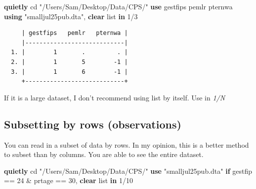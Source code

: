\documentclass[
]{book}
\newenvironment{Shaded}{\begin{snugshade}}{\end{snugshade}}
\newcommand{\KeywordTok}[1]{\textcolor[rgb]{0.13,0.29,0.53}{\textbf{#1}}}
\newcommand{\NormalTok}[1]{#1}
\newcommand{\OtherTok}[1]{\textcolor[rgb]{0.56,0.35,0.01}{#1}}
\newcommand{\StringTok}[1]{\textcolor[rgb]{0.31,0.60,0.02}{#1}}
\begin{document}
\begin{Shaded}
\begin{Highlighting}[]
\KeywordTok{quietly}\NormalTok{ cd }\StringTok{"/Users/Sam/Desktop/Data/CPS/"}
\KeywordTok{use}\NormalTok{ gestfips pemlr pternwa }\KeywordTok{using} \StringTok{"smalljul25pub.dta"}\NormalTok{, }\KeywordTok{clear}
\OtherTok{list} \KeywordTok{in}\NormalTok{ 1/3}
\end{Highlighting}
\end{Shaded}

\begin{verbatim}
     | gestfips   pemlr   pternwa |
     |----------------------------|
  1. |        1       .         . |
  2. |        1       5        -1 |
  3. |        1       6        -1 |
     +----------------------------+
\end{verbatim}

If it is a large dataset, I don't recommend using list by itself. Use in \emph{1/N}

\subsection{Subsetting by rows (observations)}\label{subsetting-by-rows-observations}

You can read in a subset of data by rows. In my opinion, this is a better method to subset than by columns. You are able to see the entire dataset.

\begin{Shaded}
\begin{Highlighting}[]
\KeywordTok{quietly}\NormalTok{ cd }\StringTok{"/Users/Sam/Desktop/Data/CPS/"}
\KeywordTok{use} \StringTok{"smalljul25pub.dta"} \KeywordTok{if}\NormalTok{ gestfip == 24 \& prtage == 30, }\KeywordTok{clear}
\OtherTok{list} \KeywordTok{in}\NormalTok{ 1/10}
\end{Highlighting}
\end{Shaded}
\end{document}
